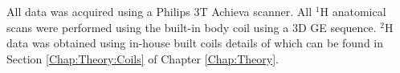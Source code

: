 All data was acquired using a Philips 3T Achieva scanner. All $^1$H anatomical scans were performed using the built-in body coil using a 3D \ac{GE} sequence. $^2$H data was obtained using in-house built coils details of which can be found in Section \ref{Chap:Theory:Coils} of Chapter \ref{Chap:Theory}. 


